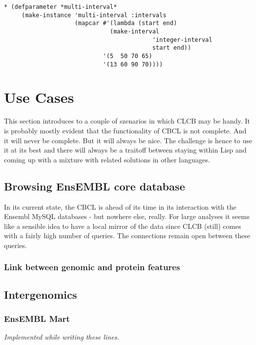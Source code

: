 \documentclass{book}
\newcommand\ensembl{EnsEMBL }
\newcommand\CLCB{CLCB }
\begin{document}
\begin{lstlisting}
* (defparameter *multi-interval*
     (make-instance 'multi-interval :intervals
                    (mapcar #'(lambda (start end)
		                      (make-interval
                                          'integer-interval
                                          start end))
                            '(5  50 70 65)
                            '(13 60 90 70))))
\end{lstlisting}



\chapter{Use Cases}

This section introduces to a couple of szenarios in which \CLCB may
be handy. It is probably mostly evident that the functionality of CBCL
is not complete. And it will never be complete. But it will always be
nice. The challenge is hence to use it at its best and there will always
be a traitoff between staying within Lisp and coming up with a mixture
with related solutions in other languages.

\section{Browsing \ensembl core database}

In its current state, the CBCL is ahead of its time in its interaction with
the Ensembl MySQL databases - but nowhere else, really. For large analyses
it seems like a sensible idea to have a local mirror of the data since
\CLCB (still) comes with a fairly high number of queries. The connections
remain open between these queries.

\subsection{Link between genomic and protein features}

\section{Intergenomics}

\subsection{\ensembl Mart}

{\em Implemented while writing these lines.}
\end{document}
